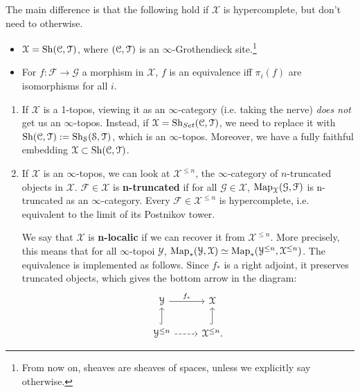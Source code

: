 The main difference is that the following hold if $\mathcal{X}$ is hypercomplete, but don't need to otherwise.
\begin{itemize}
\item $\mathcal{X} = \mathrm{Sh}(\mathcal C, \mathcal T)$, where $(\mathcal C, \mathcal T)$ is an $\infty$-Grothendieck site.\footnote{From now on,
sheaves are sheaves of spaces, unless we explicitly say otherwise.}
\item For $f: \mathcal{F} \to \mathcal{G}$ a morphism in $\mathcal{X}$, $f$ is an equivalence
iff $\pi_i(f)$ are isomorphisms for all $i$.
\end{itemize}

\begin{rem}
\begin{enumerate}
\item If $\mathcal{X}$ is a 1-topos, viewing it as an $\infty$-category (i.e. taking the nerve) \emph{does not} get us
an $\infty$-topos. Instead, if $\mathcal{X} = \mathrm{Sh}_{Set}(\mathcal C, \mathcal T)$, we need to replace it with $\mathrm{Sh}(\mathcal C,\mathcal T) :=\mathrm{Sh}_{\mathcal S}(\mathcal S,\mathcal T)$,
which is an $\infty$-topos. Moreover, we have a fully faithful embedding $\mathcal{X} \subset \mathrm{Sh}(\mathcal C,\mathcal T)$.

\item If $\mathcal{X}$ is an $\infty$-topos, we can look at $\mathcal{X}^{\leq n}$, the $\infty$-category of $n$-truncated 
objects in $\mathcal{X}$. $\mathcal{F} \in \mathcal{X}$
is \textbf{n-truncated} if for all $\mathcal{G} \in \mathcal{X}$, $\operatorname{Map}_{\mathcal{X}}(\mathcal{G},\mathcal{F})$ is n-truncated
as an $\infty$-category. Every $\mathcal{F} \in \mathcal{X}^{\leq n}$ is hypercomplete, i.e. equivalent to the limit of its
Postnikov tower.

We say that $\mathcal{X}$ is \textbf{n-localic} if we can recover it from $\mathcal{X}^{\leq n}$. More precisely, this means that
for all $\infty$-topoi $\mathcal{Y}$, $\operatorname{Map}_*(\mathcal{Y}, \mathcal{X}) \simeq \operatorname{Map}_*(\mathcal{Y}^{\leq n}, \mathcal{X}^{\leq n})$.
The equivalence is implemented as follows. Since $f_*$ is a right adjoint, it preserves truncated objects, which gives the
bottom arrow in the diagram:
\[
\begin{tikzcd}
\mathcal{Y}\arrow{r}{f_*} & \mathcal{X} \\
\mathcal{Y}^{\leq n}\arrow[hook]{u}\arrow[dashed]{r} & \mathcal{X}^{\leq n}\arrow[hook]{u}.
\end{tikzcd}
\]


\end{enumerate}
\end{rem}
